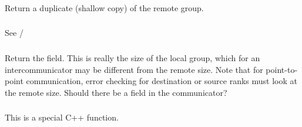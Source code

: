 \documentclass{article}
\begin{document}
\subsubsection{}
Return a duplicate (shallow copy) of the remote group.

\subsubsection{}
See /

\subsubsection{}
Return the  field.  This is really the size of the local
group, which for an intercommunicator may be different from the remote
size.  Note that for point-to-point communication, error checking for
destination or source ranks must look at the remote size.  Should
there be a  field in the communicator?

\subsubsection{}
\subsubsection{}
\subsubsection{}
\subsubsection{}

\subsubsection{}
\subsubsection{}
\subsubsection{}
This is a special C++ function.
\end{document}

